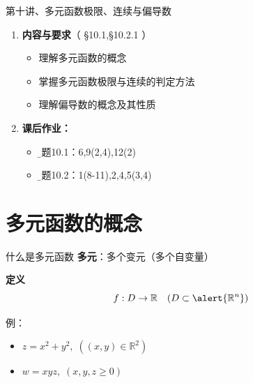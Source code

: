 
\begin{frame}{第十讲、多元函数极限、连续与偏导数}
	\linespread{1.5}
	\begin{enumerate}
	  \item {\bf 内容与要求}{\color{blue}（ \S10.1,\S10.2.1 ）}
	  \begin{itemize}
	    \item 理解多元函数的概念
	    \item 掌握多元函数极限与连续的判定方法
	    \item 理解偏导数的概念及其性质
	  \vspace{1em}
	  \end{itemize}
	  \item {\bf  课后作业：}
	  \begin{itemize}
	    \item {\b 习题10.1：6,9(2,4),12(2)}
	    \item {\b 习题10.2：1(8-11),2,4,5(3,4)}
	  \end{itemize}
	\end{enumerate}
\end{frame}

\section{多元函数的概念}

\begin{frame}{什么是多元函数}
	\linespread{1.2}\pause 
	{\bf 多元}：多个变元（多个自变量）\pause 
	\begin{block}{{\bf 定义}\hfill}
		$$f:D\to\mathbb{R}\quad(D\subset\alert{\mathbb{R}^n})$$
	\end{block}\pause 
	例：
	\begin{itemize}
	  \item $z=x^2+y^2, \;((x,y)\in\mathbb{R}^2)$\pause 
	  \item $w=xyz,\;(x,y,z\geq 0)$\pause 
	\end{itemize}
	\begin{center}
	\end{center}
\end{frame}

